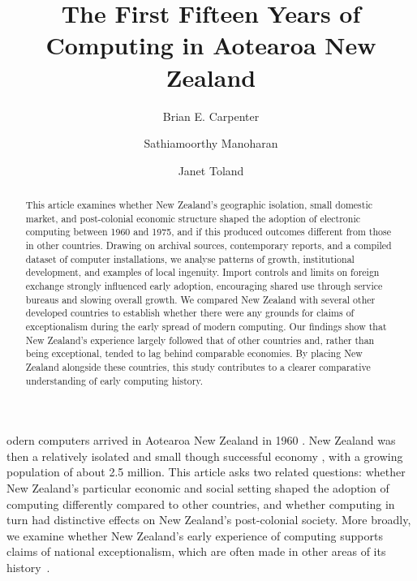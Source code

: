 \documentclass{IEEEcsmag}
\begin{document}

\title{The First Fifteen Years of Computing in Aotearoa New Zealand}

\author{Brian E. Carpenter}

\author{Sathiamoorthy Manoharan}

\author{Janet Toland}




\begin{abstract}
\cbstart
This article examines whether New Zealand's geographic isolation, small domestic market, and post-colonial economic structure shaped the adoption of electronic computing between 1960 and 1975, and if this produced outcomes different from those in other countries. Drawing on archival sources, contemporary reports, and a compiled dataset of computer installations, we analyse patterns of growth, institutional development, and examples of local ingenuity.
Import controls and limits on foreign exchange strongly influenced early adoption, encouraging shared use through service bureaus and slowing overall growth.
We compared New Zealand with several other developed countries to establish whether there were any grounds for claims of exceptionalism during the early spread of modern computing. Our findings show that New Zealand's experience largely followed that of other countries and, rather than being exceptional, tended to lag behind comparable economies. By placing New Zealand alongside these countries, this study contributes to a clearer comparative understanding of early computing history.
\cbend
\end{abstract}


\maketitle


odern computers arrived in Aotearoa New Zealand in 1960 \cite{FirstCinNZ}. 
New Zealand was then a relatively isolated and small though successful economy \cite{Easton-2020},
with a growing population of about 2.5 million.
\cbstart
This article asks two related questions: whether New Zealand's particular economic and
social setting shaped the adoption of computing differently compared to other countries,
and whether computing in turn had distinctive effects on New Zealand's post-colonial society.
More broadly, we examine whether New Zealand's early experience of computing supports
claims of national exceptionalism, which are
often made in other areas of its history~\cite{Frykberg-2025}.
\end{document}
